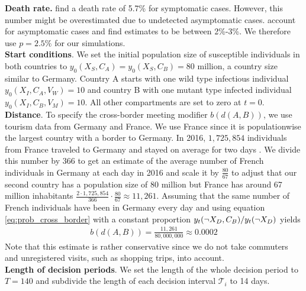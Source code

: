 \textbf{Death rate.} \cite{Baud.2020} find a death rate of 5.7\% for symptomatic cases. However, this number might be overestimated due to undetected asymptomatic cases. \cite{Wu.2020} account for asymptomatic cases and find estimates to be between 2\%-3\%. We therefore use $p=2.5\%$ for our simulations.\\

\textbf{Start conditions}. We set the initial population size of susceptible individuals in both countries to $y_0(X_S, C_A) = y_0(X_S, C_B) = 80$ million, a country size similar to Germany. Country A starts with one wild type infectious individual $y_0(X_I, C_A, V_W) = 10$ and country B with one mutant type infected individual $y_0(X_I, C_B, V_M) = 10$. All other compartments are set to zero at $t=0$. \\

\textbf{Distance}. To specify the cross-border meeting modifier $b(d(A,B))$, we use tourism data from Germany and France. We use France since it is populationwise the largest country with a border to Germany. In 2016, $1,725,854$ individuals from France traveled to Germany and stayed on average for two days \citep{SBA.2017}. We divide this number by 366 to get an estimate of the average number of French individuals in Germany at each day in 2016 and scale it by $\frac{80}{67}$ to adjust that our second country has a population size of 80 million but France has around 67 million inhabitants $\frac{2 \cdot 1,725,854}{366} \cdot \frac{80}{67
} \approx 11,261$. Assuming that the same number of French individuals have been in Germany every day and using equation \eqref{eq:prob_cross_border} with a constant proportion $y_t(\neg X_D, C_B) / y_t(\neg X_D)$ yields 
\begin{align*}
b(d(A, B)) = \frac{11,261}{80,000,000} \approx 0.0002
\end{align*}
Note that this estimate is rather conservative since we do not take commuters and unregistered visits, such as shopping trips, into account. \\

\textbf{Length of decision periods}. We set the length of the whole decision period to $T=140$ and subdivide the length of each decision interval $\mathcal{T}_i$ to 14 days. \\

